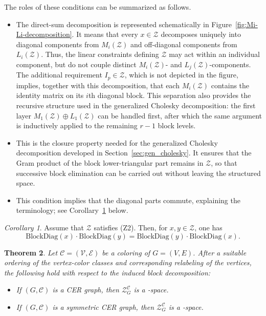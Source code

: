 \documentclass[12pt]{amsart}
\theoremstyle{plain}
\newtheorem{theorem}{Theorem}[section]
\theoremstyle{definition}
\theoremstyle{remark}
\newtheorem{corol}[theorem]{Corollary}
\newcommand{\1}{\mathbf{1}}
\newcommand{\coloredZ}{\mathcal{Z}_{G}^{\mathcal{C}}}
\newcommand{\bdiag}{\mathrm{BlockDiag}}
\begin{document}
The roles of these conditions can be summarized as follows.
\begin{itemize}
    \item[(Z0)] The direct-sum decomposition is represented schematically in Figure~\ref{fig:Mi-Li-decomposition}. It means that every $x\in\mathcal Z$ decomposes uniquely into diagonal components from $M_i(\mathcal Z)$ and off-diagonal components from $L_i(\mathcal Z)$. Thus, the linear constraints defining $\mathcal Z$ may act within an individual component, but do not couple distinct $M_i(\mathcal Z)$- and $L_j(\mathcal Z)$-components. The additional requirement $I_p\in\mathcal Z$, which is not depicted in the figure, implies, together with this decomposition, that each $M_i(\mathcal Z)$ contains the identity matrix on its $i$th diagonal block. This separation also provides the recursive structure used in the generalized Cholesky decomposition: the first layer $M_1(\mathcal Z)\oplus L_1(\mathcal Z)$ can be handled first, after which the same argument is inductively applied to the remaining $r-1$ block levels.
    \item[(Z1)] This is the closure property needed for the generalized Cholesky decomposition developed in Section~\ref{sec:gen_cholesky}. It ensures that the Gram product of the block lower-triangular part remains in $\mathcal Z$, so that successive block elimination can be carried out without leaving the structured space.
    \item[(Z2)] This condition implies that the diagonal parts commute, explaining the terminology; see Corollary~\ref{lemma:commutativity} below.
\end{itemize}
\begin{corol} \label{lemma:commutativity}
Assume that $\mathcal{Z}$ satisfies (Z2). Then, for $x, y \in \mathcal{Z}$, one has 
\[
\bdiag(x) \cdot \bdiag(y) = \bdiag(y) \cdot \bdiag(x).
\]
\end{corol}


\begin{theorem}\label{thm:ZGCisNice}
Let $\mathcal{C}=(\mathcal{V},\mathcal{E})$ be a coloring
of $G=(V,E)$.
After a suitable ordering of the vertex-color classes and
corresponding relabeling of the vertices, the following hold
with respect to the induced block decomposition:
\begin{itemize}
    \item[(i)]
    If $(G,\mathcal{C})$ is a CER graph, then
    $\coloredZ$ is a \BC-space.
    \item[(ii)]
    If $(G,\mathcal{C})$ is a symmetric CER graph, then
    $\coloredZ$ is a \cBC-space.
\end{itemize}
\end{theorem}
\end{document}
